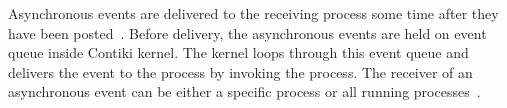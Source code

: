 Asynchronous events are delivered to the receiving process
some time after they have been posted~\cite{contiki-wiki-processes}.
Before delivery, the asynchronous events are held on event queue inside Contiki kernel.
The kernel loops through this event queue and delivers
the event to the process by invoking the process. 
The receiver of an asynchronous event can be either a specific process
or all running processes~\cite{contiki-wiki-processes}.



